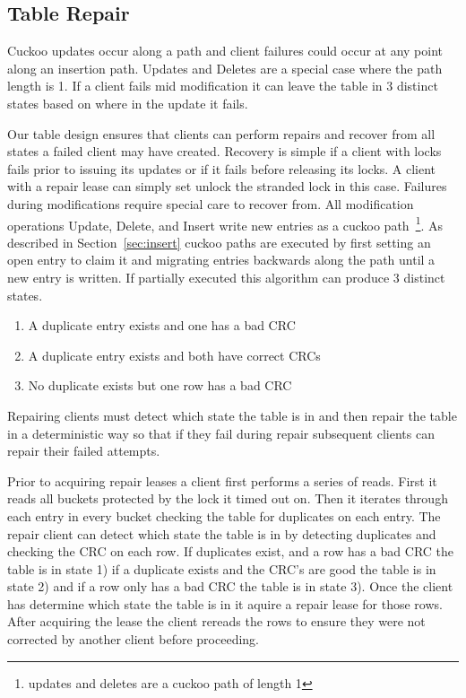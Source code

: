 \subsection{Table Repair} 
\label{sec:table-repair}

Cuckoo updates occur along a path
and client failures could occur at any point along an
insertion path. Updates and Deletes are a special case where
the path length is 1. If a client fails mid modification it
can leave the table in 3 distinct states based on where in
the update it fails. 

Our table design ensures that clients can perform repairs
and recover from all states a failed client may have
created. Recovery is simple if a client with locks fails
prior to issuing its updates or if it fails before releasing
its locks. A client with a repair lease can simply set
unlock the stranded lock in this case. Failures during
modifications require special care to recover from. All
modification operations Update, Delete, and Insert write new
entries as a cuckoo path~\footnote{updates and deletes are a
cuckoo path of length 1}. As described in
Section~\ref{sec:insert} cuckoo paths are executed by first
setting an open entry to claim it and migrating entries
backwards along the path until a new entry is written. If
partially executed this algorithm can produce 3 distinct
states.

\begin{enumerate}
    \item{A duplicate entry exists and one has a bad CRC}
    \item{A duplicate entry exists and both have correct CRCs} 
    \item{No duplicate exists but one row has a bad CRC}
\end{enumerate}

Repairing clients must detect which state the
table is in and then repair the table in a deterministic way
so that if they fail during repair subsequent clients can
repair their failed attempts.

Prior to acquiring repair leases a client first performs a
series of reads. First it reads all buckets protected by the
lock it timed out on. Then it iterates through each entry in
every bucket checking the table for duplicates on each
entry. The repair client can detect which state the table is
in by detecting duplicates and checking the CRC on each row.
If duplicates exist, and a row has a bad CRC the table is in
state 1) if a duplicate exists and the CRC's are good the
table is in state 2) and if a row only has a bad CRC the
table is in state 3). Once the client has determine which
state the table is in it aquire a repair lease for those
rows. After acquiring the lease the client rereads the rows
to ensure they were not corrected by another client before
proceeding. 


